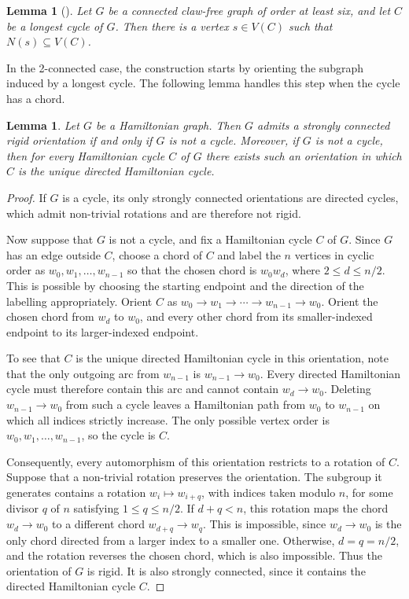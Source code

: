 \documentclass[a4paper,12pt]{elsarticle}
\newtheorem{lemma}[theorem]{Lemma}
\begin{document}
\begin{lemma}[\cite{GorzkowskaKargul}] \label{lem: NsinC}
Let $G$ be a connected claw-free graph of order at least six, and let $C$ be a longest cycle of $G$. Then there is a vertex $s\in V(C)$ such that $N(s)\subseteq V(C)$.
\end{lemma}

In the 2-connected case, the construction starts by orienting the subgraph induced by a longest cycle. The following lemma handles this step when the cycle has a chord.

\begin{lemma} \label{lem: strong_rigid_hamiltonian}
Let $G$ be a Hamiltonian graph. Then $G$ admits a strongly connected rigid orientation if and only if $G$ is not a cycle. Moreover, if $G$ is not a cycle, then for every Hamiltonian cycle $C$ of $G$ there exists such an orientation in which $C$ is the unique directed Hamiltonian cycle.
\end{lemma}
\begin{proof}
If $G$ is a cycle, its only strongly connected orientations are directed cycles, which admit non-trivial rotations and are therefore not rigid.

Now suppose that $G$ is not a cycle, and fix a Hamiltonian cycle $C$ of $G$. Since $G$ has an edge outside $C$, choose a chord of $C$ and label the $n$ vertices in cyclic order as $w_0,w_1,\ldots,w_{n-1}$ so that the chosen chord is $w_0w_d$, where $2\leq d\leq n/2$. This is possible by choosing the starting endpoint and the direction of the labelling appropriately. Orient $C$ as $w_0\to w_1\to\cdots\to w_{n-1}\to w_0$. Orient the chosen chord from $w_d$ to $w_0$, and every other chord from its smaller-indexed endpoint to its larger-indexed endpoint.

To see that $C$ is the unique directed Hamiltonian cycle in this orientation, note that the only outgoing arc from $w_{n-1}$ is $w_{n-1}\to w_0$. Every directed Hamiltonian cycle must therefore contain this arc and cannot contain $w_d\to w_0$. Deleting $w_{n-1}\to w_0$ from such a cycle leaves a Hamiltonian path from $w_0$ to $w_{n-1}$ on which all indices strictly increase. The only possible vertex order is $w_0,w_1,\ldots,w_{n-1}$, so the cycle is $C$.

Consequently, every automorphism of this orientation restricts to a rotation of $C$. Suppose that a non-trivial rotation preserves the orientation. The subgroup it generates contains a rotation $w_i\mapsto w_{i+q}$, with indices taken modulo $n$, for some divisor $q$ of $n$ satisfying $1\leq q\leq n/2$. If $d+q<n$, this rotation maps the chord $w_d\to w_0$ to a different chord $w_{d+q}\to w_q$. This is impossible, since $w_d\to w_0$ is the only chord directed from a larger index to a smaller one. Otherwise, $d=q=n/2$, and the rotation reverses the chosen chord, which is also impossible. Thus the orientation of $G$ is rigid. It is also strongly connected, since it contains the directed Hamiltonian cycle $C$.
\end{proof}
\end{document}
